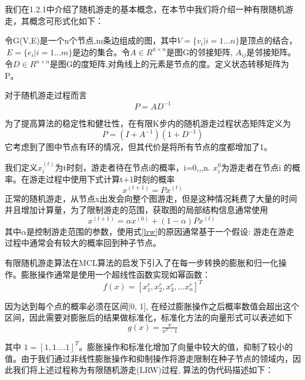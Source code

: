 我们在1.2.1中介绍了随机游走的基本概念，在本节中我们将介绍一种有限随机游走，其概念可形式化如下：

令G(V,E)是一个n个节点,m条边组成的图，其中$V=\{v_{i} |i=1...n\}$是顶点的结合，$\ E=\{e_{i} |i=1...m\}$是边的集合。令$A \in R^{n\times n}$是图G的邻接矩阵, $A_{ij}$是邻接矩阵。令$D \in R^{n\times n}$是图G的度矩阵,对角线上的元素是节点的度。定义状态转移矩阵为P。

对于随机游走过程而言
\begin{equation}
	P = AD^{-1}
\end{equation}

为了提高算法的稳定性和健壮性，在有限K步内的随机游走过程状态矩阵定义为
\begin{equation}
	P=(I+A^{-1})(1+D^{-1})
\end{equation}
它考虑到了图中节点有环的情况，但其代价是将所有节点的度都增加了1。

我们定义$x_{i}^{(t)}$为t时刻，游走者待在节点i的概率，i=0,,,n. $x_{i}^{0}$为游走者在节点i 的概率。在游走过程中使用下式计算t+1时刻的概率
\begin{equation}
	x^{(t+1)}=Px^{(t)}
\end{equation}
正常的随机游走，从节点x出发会向整个图游走，但是这种情况耗费了大量的时间并且增加计算量，为了限制游走的范围，获取图的局部结构信息通常使用
 \begin{equation}
 x^{( t+1)} =\alpha x^{( 0)} +( 1-\alpha ) Px^{( t)} \
 \label{lrw}
 \end{equation}
 其中$\alpha$是控制游走范围的参数，使用式\ref{lrw}的原因通常基于一个假设: 游走在游走过程中通常会有较大的概率回到种子节点。

 有限随机游走算法在MCL算法的启发下引入了在每一步转换的膨胀和归一化操作。膨胀操作通常是使用一个超线性函数实现如幂函数：
 \begin{equation}
f( x) =\left[ x^{r}_{1} ,x^{r}_{2} ,x^{r}_{3} ,...x^{r}_{n}\right]^{T}
\label{inflation}
\end{equation}

因为达到每个点的概率必须在区间[0, 1], 在经过膨胀操作之后概率数值会超出这个区间，因此需要对膨胀后的结果做标准化，标准化方法的向量形式可以表述如下
 \begin{equation}
g( x) =\tfrac{x}{x^{T} \ \cdotp \ 1}
 \end{equation}

其中 $1 = [1,1....1]^{T}$。膨胀操作和标准化增加了向量中较大的值，抑制了较小的值。由于我们通过非线性膨胀操作和抑制操作将游走限制在种子节点的领域内，因此我们将上述过程称为有限随机游走(LRW)过程, 算法的伪代码描述如下：
\\
\\
\\

